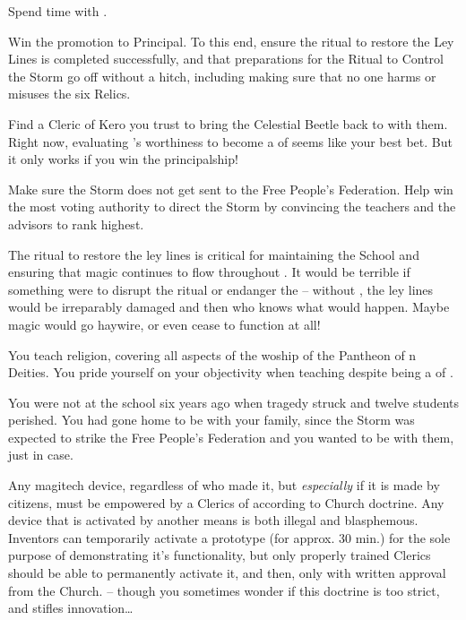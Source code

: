 \documentclass[char]{GL2020}
\begin{document}
\begin{itemz}
	\item Spend time with \cJuniorStatesman{}.
	\item Win the promotion to Principal. To this end, ensure the ritual to restore the Ley Lines is completed successfully, and that preparations for the Ritual to Control the Storm go off without a hitch, including making sure that no one harms or misuses the six Relics.
	\item Find a Cleric of Kero you trust to bring the Celestial Beetle back to \pTech{} with them. Right now, evaluating \cHeadScientist{}'s worthiness to become a \cHeadScientist{\clergy} of \cTechGod{} seems like your best bet. But it only works if you win the principalship!
	\item Make sure the Storm does not get sent to the Free People's Federation. Help \cTechStar{} win the most voting authority to direct the Storm by convincing the \pShip{} teachers and the \pTech{} advisors to rank \cTechStar{\them} highest.
\end{itemz}

\begin{itemz}[Notes]
	\item The ritual to restore the ley lines is critical for maintaining the School and ensuring that magic continues to flow throughout \pEarth{}.  It would be terrible if something were to disrupt the ritual or endanger the \pSc{} – without \pSc{}, the ley lines would be irreparably damaged and then who knows what would happen. Maybe magic would go haywire, or even cease to function at all!
	\item You teach religion, covering all aspects of the woship of the Pantheon of \pEarth{}n Deities. You pride yourself on your objectivity when teaching despite being a \cBeetle{\cleric} of \cTechGod{}.
	\item You were not at the school six years ago when tragedy struck and twelve students perished. You had gone home to be with your family, since the Storm was expected to strike the Free People's Federation and you wanted to be with them, just in case.
	\item  Any magitech device, regardless of who made it, but \emph{especially} if it is made by \pTech{} citizens, must be empowered by a Clerics of \cTechGod{} according to Church doctrine. Any device that is activated by another means is both illegal and blasphemous. Inventors can temporarily activate a prototype (for approx. 30 min.) for the sole purpose of demonstrating it's functionality, but only properly trained Clerics should be able to permanently activate it, and then, only with written approval from the Church. – though you sometimes wonder if this doctrine is too strict, and stifles innovation\ldots{}
\end{itemz}
\end{document}
